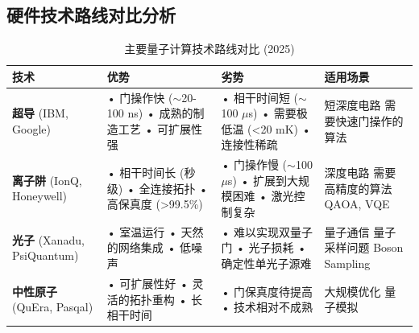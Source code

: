 \documentclass[11pt,a4paper]{article}
\begin{document}
\subsection{硬件技术路线对比分析}

\begin{table}[H]
\centering
\caption{主要量子计算技术路线对比 (2025)}
\begin{tabular}{@{}p{3cm}p{4cm}p{4cm}p{3.5cm}@{}}
\toprule
\textbf{技术} & \textbf{优势} & \textbf{劣势} & \textbf{适用场景} \\ \midrule

\textbf{超导} (IBM, Google) & 
• 门操作快 ($\sim$20-100 ns) \newline
• 成熟的制造工艺 \newline  
• 可扩展性强 & 
• 相干时间短 ($\sim$100 $\mu$s) \newline
• 需要极低温 (<20 mK) \newline
• 连接性稀疏 & 
短深度电路 \newline
需要快速门操作的算法 \\
\midrule

\textbf{离子阱} (IonQ, Honeywell) & 
• 相干时间长 (秒级) \newline
• 全连接拓扑 \newline
• 高保真度 (>99.5\%) & 
• 门操作慢 ($\sim$100 $\mu$s) \newline
• 扩展到大规模困难 \newline
• 激光控制复杂 & 
深度电路 \newline
需要高精度的算法 \newline
QAOA, VQE \\
\midrule

\textbf{光子} (Xanadu, PsiQuantum) & 
• 室温运行 \newline
• 天然的网络集成 \newline
• 低噪声 & 
• 难以实现双量子门 \newline
• 光子损耗 \newline
• 确定性单光子源难 & 
量子通信 \newline
量子采样问题 \newline
Boson Sampling \\
\midrule

\textbf{中性原子} (QuEra, Pasqal) & 
• 可扩展性好 \newline
• 灵活的拓扑重构 \newline
• 长相干时间 & 
• 门保真度待提高 \newline
• 技术相对不成熟 & 
大规模优化 \newline
量子模拟 \\

\bottomrule
\end{tabular}
\end{table}
\end{document}
